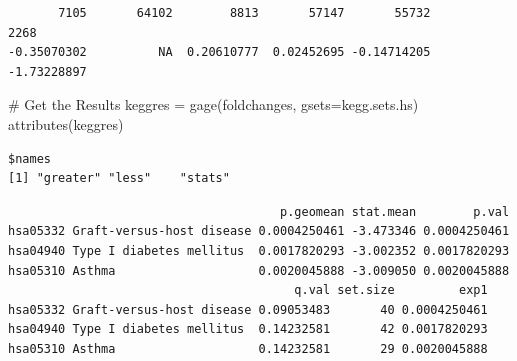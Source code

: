 \documentclass[
  letterpaper,
  DIV=11,
  numbers=noendperiod]{scrartcl}
\newenvironment{Shaded}{\begin{snugshade}}{\end{snugshade}}
\newcommand{\AttributeTok}[1]{\textcolor[rgb]{0.40,0.45,0.13}{#1}}
\newcommand{\CommentTok}[1]{\textcolor[rgb]{0.37,0.37,0.37}{#1}}
\newcommand{\DecValTok}[1]{\textcolor[rgb]{0.68,0.00,0.00}{#1}}
\newcommand{\FunctionTok}[1]{\textcolor[rgb]{0.28,0.35,0.67}{#1}}
\newcommand{\NormalTok}[1]{\textcolor[rgb]{0.00,0.23,0.31}{#1}}
\newcommand{\OtherTok}[1]{\textcolor[rgb]{0.00,0.23,0.31}{#1}}
\newcommand{\SpecialCharTok}[1]{\textcolor[rgb]{0.37,0.37,0.37}{#1}}
\begin{document}
\begin{Shaded}
\end{Shaded}

\begin{verbatim}
       7105       64102        8813       57147       55732        2268 
-0.35070302          NA  0.20610777  0.02452695 -0.14714205 -1.73228897 
\end{verbatim}

\begin{Shaded}
\begin{Highlighting}[]
\CommentTok{\# Get the Results}
\NormalTok{keggres }\OtherTok{=} \FunctionTok{gage}\NormalTok{(foldchanges, }\AttributeTok{gsets=}\NormalTok{kegg.sets.hs)}
\FunctionTok{attributes}\NormalTok{(keggres)}
\end{Highlighting}
\end{Shaded}

\begin{verbatim}
$names
[1] "greater" "less"    "stats"  
\end{verbatim}

\begin{Shaded}
\end{Shaded}

\begin{verbatim}
                                      p.geomean stat.mean        p.val
hsa05332 Graft-versus-host disease 0.0004250461 -3.473346 0.0004250461
hsa04940 Type I diabetes mellitus  0.0017820293 -3.002352 0.0017820293
hsa05310 Asthma                    0.0020045888 -3.009050 0.0020045888
                                        q.val set.size         exp1
hsa05332 Graft-versus-host disease 0.09053483       40 0.0004250461
hsa04940 Type I diabetes mellitus  0.14232581       42 0.0017820293
hsa05310 Asthma                    0.14232581       29 0.0020045888
\end{verbatim}
\end{document}
